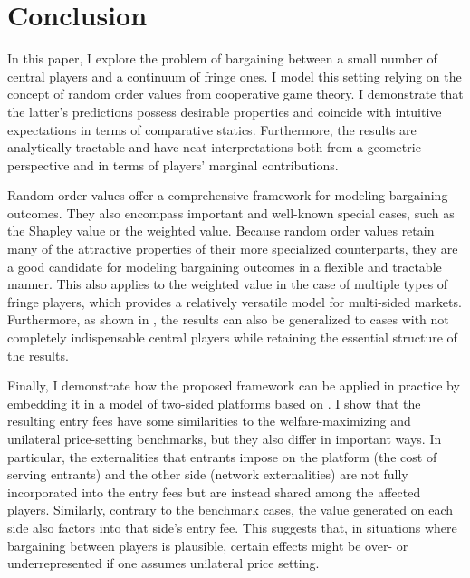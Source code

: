 \section{Conclusion}
\label{sec:conclusions}

In this paper, I explore the problem of bargaining between a small number of central players and a continuum of fringe ones.
I model this setting relying on the concept of random order values from cooperative game theory.
I demonstrate that the latter's predictions possess desirable properties and coincide with intuitive expectations in terms of comparative statics.
Furthermore, the results are analytically tractable and have neat interpretations both from a geometric perspective and in terms of players' marginal contributions.

Random order values offer a comprehensive framework for modeling bargaining outcomes.
They also encompass important and well-known special cases, such as the Shapley value or the weighted value.
Because random order values retain many of the attractive properties of their more specialized counterparts, they are a good candidate for modeling bargaining outcomes in a flexible and tractable manner.
This also applies to the weighted value in the case of multiple types of fringe players, which provides a relatively versatile model for multi-sided markets.
Furthermore, as shown in , the results can also be generalized to cases with not completely indispensable central players while retaining the essential structure of the results.

Finally, I demonstrate how the proposed framework can be applied in practice by embedding it in a model of two-sided platforms based on \textcite{armstrong2006competition}.
I show that the resulting entry fees have some similarities to the welfare-maximizing and unilateral price-setting benchmarks, but they also differ in important ways.
In particular, the externalities that entrants impose on the platform (the cost of serving entrants) and the other side (network externalities) are not fully incorporated into the entry fees but are instead shared among the affected players.
Similarly, contrary to the benchmark cases, the value generated on each side also factors into that side's entry fee.
This suggests that, in situations where bargaining between players is plausible, certain effects might be over- or underrepresented if one assumes unilateral price setting.


